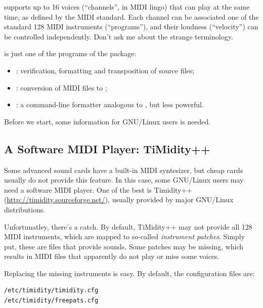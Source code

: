 \documentclass[a4paper,12pt]{book}
\begin{document}
\abcmid{} supports up to 16 voices (``channels'', in MIDI lingo) that
can play at the same time, as defined by the MIDI standard. Each
channel can be associated one of the standard 128 MIDI instruments
(``programs''), and their loudness (``velocity'') can be controlled
independently. Don't ask me about the strange terminology.

\abcmid{} is just one of the programs of the \abcMID{} package:

\begin{itemize}
  
  \item {}: verification, formatting and transposition of
  \ABC{} source files;
  
  \item {}: conversion of MIDI files to \ABC;
  
  \item {}: a command-line formatter analogous to \abcm, but
  less powerful.
  
  
\end{itemize}

Before we start, some information for GNU/Linux users is needed.


\subsection{A Software MIDI Player: TiMidity++}

Some advanced sound cards have a built-in MIDI syntesizer, but cheap
cards usually do not provide this feature. In this case, some 
GNU/Linux users may need a software MIDI player. One of the best is
Timidity++ (\url{http://timidity.sourceforge.net/}), usually provided
by major GNU/Linux distributions. 

Unfortunatley, there's a catch. By default, TiMidity++ may not provide
all 128 MIDI instruments, which are mapped to so-called
\emph{instrument patches}. Simply put, these are files that provide
sounds. Some patches may be missing, which results in MIDI files that
apparently do not play or miss some voices.

Replacing the missing instruments is easy. By default, the
configuration files are:

\begin{verbatim}
/etc/timidity/timidity.cfg
/etc/timidity/freepats.cfg
\end{verbatim}
\end{document}

